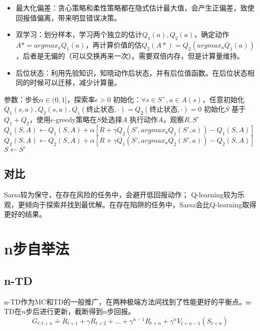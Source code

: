 \documentclass[
12pt, %
a4paper, 
oneside, %
headinclude,footinclude, %
]{scrartcl}
\begin{document}
\begin{itemize}
\item 最大化偏差：贪心策略和柔性策略都在隐式估计最大值，会产生正偏差，致使回报值偏离，带来明显错误决策。
\item 双学习：划分样本，学习两个独立的估计$ Q_1(a),Q_2(a) $，确定动作$ A* = argmax_a Q_1(a) $，再计算价值的估$ Q_2(A*) = Q_2(argmax_a Q_1(a)) $，后者是无偏的（可以交换再来一次）。需要双倍内存，但是计算量维持。
\item 后位状态：利用先验知识，知晓动作后状态，并有后位值函数。在后位状态相同的时候可以迁移，减少计算量。
\end{itemize}
\begin{myalgorithm}[双Q-learning]
\State 参数：步长$ \alpha \in (0,1] $，探索率$ \epsilon > 0 $
\State 初始化：$ \forall s \in S^+, a \in A(s) $，任意初始化$ Q_1(s,a),Q_2(s,a), Q_1(\text{终止状态}, \cdot) = Q_2(\text{终止状态}, \cdot) = 0 $
\State 初始化$ S $
\State 基于$ Q_1 + Q_2 $，使用$ \epsilon $-greedy策略在$ S $处选择$ A $
\State 执行动作$ A $，观察$ R,S' $
\State $ Q_1(S, A) \gets Q_1(S, A) + \alpha [R + \gamma Q_2(S', argmax_a Q_1(S',a)) - Q_1(S, A)] $
\Else
\State $ Q_2(S, A) \gets Q_2(S, A) + \alpha [R + \gamma Q_1(S', argmax_a Q_2(S',a)) - Q_2(S, A)] $
\EndIf
\State $ S \gets S' $
\EndWhile
\EndFor
\end{myalgorithm}
\subsection[对比]{对比}
Sarsa较为保守，在存在风险的任务中，会避开低回报动作； Q-learning较为乐观，更倾向于探索并找到最优解。在存在陷阱的任务中，Sarsa会比Q-learning取得更好的结果。
\section{n步自举法}
\subsection[n-TD]{n-TD}
n-TD作为MC和TD的一般推广，在两种极端方法间找到了性能更好的平衡点。n-TD在$ n $步后进行更新，截断得到$ n $步回报。
$$ G_{t:t + n} \doteq R_{t + 1} + \gamma R_{t + 2} + \dots + \gamma^{n - 1} R_{t + n} + \gamma^n V_{t + n - 1}(S_{t + n}) $$
\end{document}
